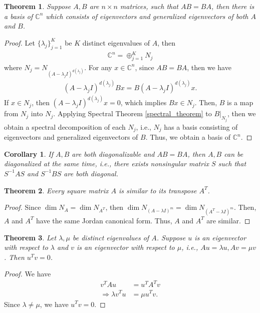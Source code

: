 \documentclass[11pt]{book}
\newtheorem{theorem}{Theorem}[section]
\newtheorem{corollary}{Corollary}[theorem]
\theoremstyle{definition}
\numberwithin{equation}{chapter}
\begin{document}
\medskip

\begin{theorem}{\rm \cite{18}}\label{commute_eigenspace}
Suppose $A, B$ are $n\times n$ matrices, such that $AB = BA$, then there is a basis of $\mathbb{C}^n$ which consists of eigenvectors and generalized eigenvectors of both $A$ and $B$.
\end{theorem}
\begin{proof}
Let $\{\lambda_j\}^K_{j=1}$ be $K$ distinct eigenvalues of $A$, then 
\begin{align*}
    \mathbb{C}^n = \oplus^K_{j=1} N_j
\end{align*}
where $N_j = N_{(A - \lambda_j I)^{d(\lambda_j)}}$. For any $x\in\mathbb{C}^n$, since $AB = BA$, then we have
\begin{align*}
    (A - \lambda_j I)^{d(\lambda_j)} B x = B (A - \lambda_j I)^{d(\lambda_j)} x.
\end{align*}
If $x\in N_j$, then $ (A - \lambda_j I)^{d(\lambda_j)} x = 0$, which implies $Bx\in N_j$. Then, $B$ is a map from $N_j$ into $N_j$. Applying Spectral Theorem \ref{spectral_theorem} to $B|_{N_j}$, then we obtain a spectral decomposition of each $N_j$, i.e., $N_j$ has a basis consisting of eigenvectors and generalized eigenvectors of $B$. Thus, we obtain a basis of $\mathbb{C}^n$. 
\end{proof}

\begin{corollary}\label{diagonalized_same_time}{\rm \cite{43}}
If $A,B$ are both diagonalizable and $AB = BA$, then $A,B$ can be diagonalized at the same time, i.e., there exists nonsingular matrix $S$ such that $S^{-1}AS$ and $S^{-1}BS$ are both diagonal.
\end{corollary}

\medskip

\begin{theorem}
Every square matrix $A$ is similar to its transpose $A^T$.
\end{theorem}
\begin{proof}
Since $\dim N_A = \dim N_{A^T}$, then $\dim N_{(A-\lambda I)^m} = \dim N_{(A^T-\lambda I)^m}$. Then, $A$ and $A^T$ have the same Jordan canonical form. Thus, $A$ and $A^T$ are similar.
\end{proof}

\medskip

\begin{theorem}\label{eigenvector_transpose_theorem}
Let $\lambda, \mu$ be distinct eigenvalues of $A$. Suppose $u$ is an eigenvector with respect to $\lambda$ and $v$ is an eigenvector with respect to $\mu$, i.e., $Au = \lambda u, Av = \mu v$. Then $u^Tv = 0$.
\end{theorem}
\begin{proof}
We have 
\begin{align*}
    v^T A u & = u^T A^T v \\
    \Rightarrow \lambda v^T u & = \mu u^T v.
\end{align*}
Since $\lambda \neq \mu$, we have $u^T v = 0$.
\end{proof}
\end{document}
